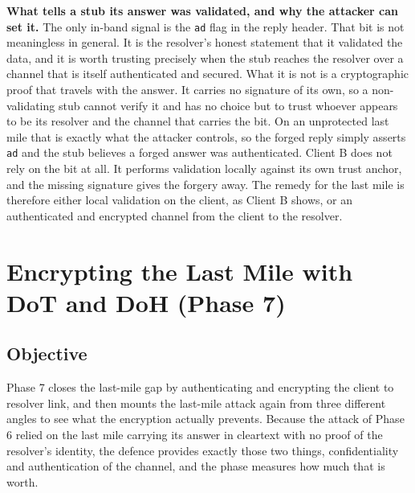 \documentclass[11pt]{article}
\begin{document}
\textbf{What tells a stub its answer was validated, and why the attacker can set
it.} The only in-band signal is the \texttt{ad} flag in the reply header. That bit
is not meaningless in general. It is the resolver's honest statement that it
validated the data, and it is worth trusting precisely when the stub reaches the
resolver over a channel that is itself authenticated and secured. What it is not is
a cryptographic proof that travels with the answer. It carries no signature of its
own, so a non-validating stub cannot verify it and has no choice but to trust
whoever appears to be its resolver and the channel that carries the bit. On an
unprotected last mile that is exactly what the attacker controls, so the forged
reply simply asserts \texttt{ad} and the stub believes a forged answer was
authenticated. Client B does not rely on the bit at all. It performs validation
locally against its own trust anchor, and the missing signature gives the forgery
away. The remedy for the last mile is therefore either local validation on the
client, as Client B shows, or an authenticated and encrypted channel from the
client to the resolver.


\clearpage

\section{Encrypting the Last Mile with DoT and DoH (Phase 7)}

\subsection{Objective}

Phase 7 closes the last-mile gap by authenticating and encrypting the client to
resolver link, and then mounts the last-mile attack again from three different
angles to see what the encryption actually prevents. Because the attack of Phase 6
relied on the last mile carrying its answer in cleartext with no proof of the
resolver's identity, the defence provides exactly those two things, confidentiality
and authentication of the channel, and the phase measures how much that is worth.
\end{document}
